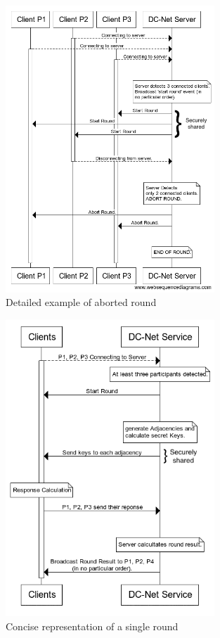 \begin{figure}[H]
    \centering
    \includegraphics[width=0.7\textwidth]{Images/Design/abortedRound.png}
    \caption{Detailed example of aborted round}
    \label{fig:abortedRound}
\end{figure}

\begin{figure}[H]
    \centering
    \includegraphics[width=0.7\textwidth]{Images/Design/singleRoundCondensed.png}
    \caption{Concise representation of a single round }
    \label{fig:singleRoundCondensed}
\end{figure}


